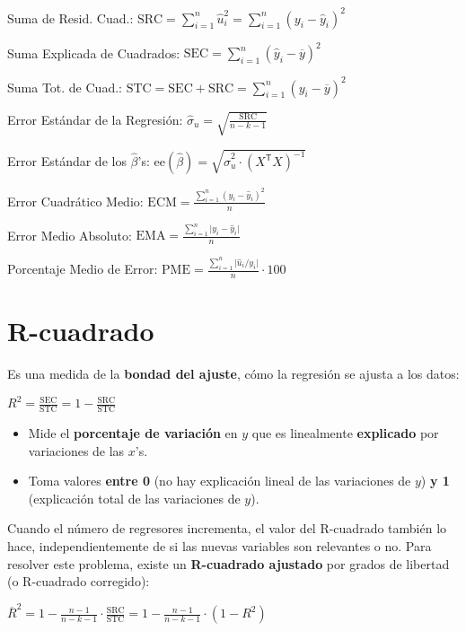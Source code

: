 \documentclass[10pt, a4paper, landscape]{extarticle}
\newcommand{\se}{\mathrm{ee}}
\newcommand{\SSR}{\mathrm{SRC}}
\newcommand{\SSE}{\mathrm{SEC}}
\newcommand{\SST}{\mathrm{STC}}
\newcommand{\tr}{\mathsf{T}}
\begin{document}
\begin{multicols}{3}
Suma de Resid. Cuad.: \hfill $\SSR = \sum_{i=1}^n \hat{u}_i^2 = \sum_{i=1}^n (y_i - \hat{y}_i)^2$

Suma Explicada de Cuadrados: \hfill $\SSE = \sum_{i=1}^n (\hat{y}_i - \overline{y})^2$

Suma Tot. de Cuad.: \hfill $\SST = \SSE + \SSR = \sum_{i=1}^n (y_i - \overline{y})^2$

Error Estándar de la Regresión: \hfill $\hat{\sigma}_u = \sqrt{\frac{\SSR}{n - k - 1}}$

Error Estándar de los $\hat{\beta}$'s: \hfill $\se(\hat{\beta}) = \sqrt{\hat{\sigma}^2_u \cdot (X^\tr X)^{-1}}$

Error Cuadrático Medio: \hfill $\mathrm{ECM} = \frac{\sum_{i=1}^n (y_i - \hat{y}_i)^2}{n}$

Error Medio Absoluto: \hfill $\mathrm{EMA} = \frac{\sum_{i=1}^n \lvert y_i - \hat{y}_i \rvert}{n}$

Porcentaje Medio de Error: \hfill $\mathrm{PME} = \frac{\sum_{i=1}^n \lvert \hat{u}_i / y_i \rvert}{n} \cdot 100$

\columnbreak

\section*{R-cuadrado}

Es una medida de la \textbf{bondad del ajuste}, cómo la regresión se ajusta a los datos:

\begin{center}
	$R^2 = \frac{\SSE}{\SST} = 1 - \frac{\SSR}{\SST}$
\end{center}

\begin{itemize}[leftmargin=*]
	\item Mide el \textbf{porcentaje de variación} en $y$ que es linealmente \textbf{explicado} por variaciones de las $x$'s.
	\item Toma valores \textbf{entre 0} (no hay explicación lineal de las variaciones de $y$) \textbf{y 1} (explicación total de las variaciones de $y$).
\end{itemize}

Cuando el número de regresores incrementa, el valor del R-cuadrado también lo hace, independientemente de si las nuevas variables son relevantes o no. Para resolver este problema, existe un \textbf{R-cuadrado ajustado} por grados de libertad (o R-cuadrado corregido):

\begin{center}
	$\overline{R}^2 = 1 - \frac{n - 1}{n - k - 1} \cdot \frac{\SSR}{\SST} = 1 - \frac{n - 1}{n - k - 1} \cdot (1 - R^2)$
\end{center}


\end{multicols}
\end{document}

